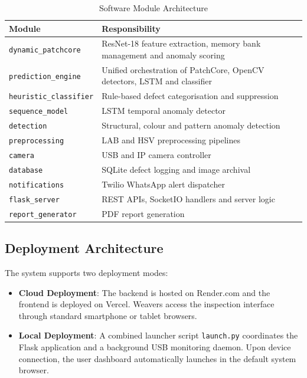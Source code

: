 \documentclass{ieeeaccess}
\begin{document}
\begin{table}[htbp]
\caption{Software Module Architecture}
\begin{center}
\begin{tabular}{|p{2.8cm}|p{5cm}|}
\hline
\textbf{Module} & \textbf{Responsibility} \\
\hline
\texttt{dynamic\_patchcore} & ResNet-18 feature extraction, memory bank management and anomaly scoring \\
\hline
\texttt{prediction\_engine} & Unified orchestration of PatchCore, OpenCV detectors, LSTM and classifier \\
\hline
\texttt{heuristic\_classifier} & Rule-based defect categorisation and suppression \\
\hline
\texttt{sequence\_model} & LSTM temporal anomaly detector \\
\hline
\texttt{detection} & Structural, colour and pattern anomaly detection \\
\hline
\texttt{preprocessing} & LAB and HSV preprocessing pipelines \\
\hline
\texttt{camera} & USB and IP camera controller \\
\hline
\texttt{database} & SQLite defect logging and image archival \\
\hline
\texttt{notifications} & Twilio WhatsApp alert dispatcher \\
\hline
\texttt{flask\_server} & REST APIs, SocketIO handlers and server logic \\
\hline
\texttt{report\_generator} & PDF report generation \\
\hline
\end{tabular}
\label{tab:modules}
\end{center}
\end{table}

\subsection{Deployment Architecture}
The system supports two deployment modes:
\begin{itemize}
    \item \textbf{Cloud Deployment}: The backend is hosted on Render.com and the frontend is deployed on Vercel. Weavers access the inspection interface through standard smartphone or tablet browsers.
    \item \textbf{Local Deployment}: A combined launcher script \texttt{launch.py} coordinates the Flask application and a background USB monitoring daemon. Upon device connection, the user dashboard automatically launches in the default system browser.
\end{itemize}
\end{document}
